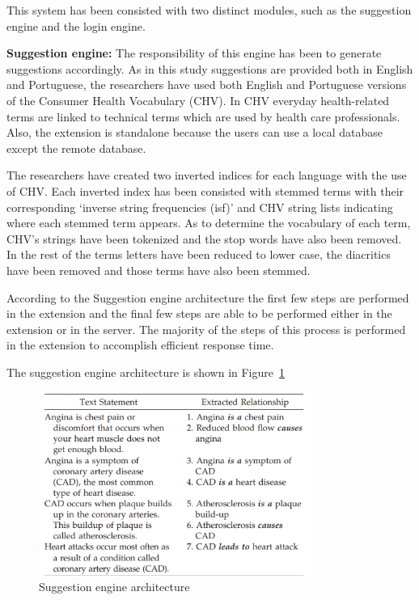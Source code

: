 \documentclass[]{article}
\begin{document}
This system has been consisted with two distinct modules, such as the suggestion engine and the login engine.
 
\textbf{Suggestion engine:} The responsibility of this engine has been to generate suggestions accordingly. As in this study suggestions are provided both in English and Portuguese, the researchers have used both English and Portuguese versions of the Consumer Health Vocabulary (CHV). In CHV everyday health-related terms are linked to technical terms which are used by health care professionals. Also, the extension is standalone because the users can use a local database except the remote database. 
      
The researchers have created two inverted indices for each language with the use of CHV. Each inverted index has been consisted with stemmed terms with their corresponding ‘inverse string frequencies (isf)’ and CHV string lists indicating where each stemmed term appears. As to determine the vocabulary of each term, CHV’s strings have been tokenized and the stop words have also been removed. In the rest of the terms letters have been reduced to lower case, the diacritics have been removed and those terms have also been stemmed.

According to the Suggestion engine architecture the first few steps are performed in the extension and the final few steps are able to be performed either in the extension or in the server. The majority of the steps of this process is performed in the extension to accomplish efficient response time. 

The suggestion engine architecture is shown in Figure~\ref{fig6}

\begin{figure}[b!]
	\includegraphics[width=0.8\textwidth]{Capture6.png}
	\caption{Suggestion engine architecture \label{fig6}}
\end{figure}   
\end{document}
